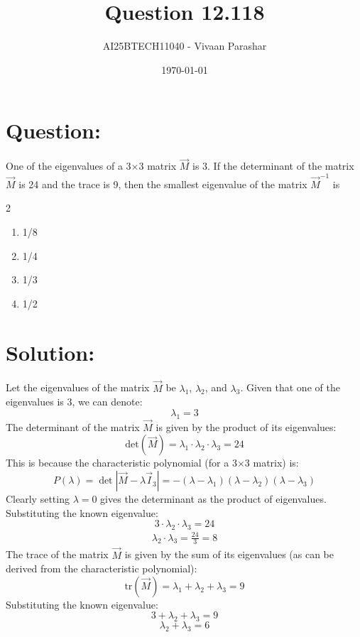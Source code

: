 \documentclass[a4paper, 12pt]{article}
\title{Question 12.118}
\author{AI25BTECH11040 - Vivaan Parashar}
\date{\today}
\begin{document}
\maketitle

\section{Question: }
One of the eigenvalues of a 3$\times$3 matrix $\vec{M}$ is 3. If the determinant of the matrix $\vec{M}$ is 24 and the trace is 9, then the smallest eigenvalue of the matrix $\vec{M}^{-1}$ is
\begin{multicols}{2}
    \begin{enumerate}[label=\alph*)]
        \item 1/8
        \item 1/4
        \item 1/3
        \item 1/2
    \end{enumerate}
\end{multicols}

\section{Solution: }
Let the eigenvalues of the matrix $\vec{M}$ be $\lambda_1$, $\lambda_2$, and $\lambda_3$. Given that one of the eigenvalues is 3, we can denote:
\[\lambda_1 = 3\]
The determinant of the matrix $\vec{M}$ is given by the product of its eigenvalues:
\[\text{det}(\vec{M}) = \lambda_1 \cdot \lambda_2 \cdot \lambda_3 = 24\]
This is because the characteristic polynomial (for a 3$\times$3 matrix) is:
\[P(\lambda) = \det\left|\vec{M}-\lambda \vec{I}_3\right| = -(\lambda - \lambda_1)(\lambda - \lambda_2)(\lambda - \lambda_3)\]
Clearly setting $\lambda = 0$ gives the determinant as the product of eigenvalues.
Substituting the known eigenvalue:
\[3 \cdot \lambda_2 \cdot \lambda_3 = 24\]
\begin{align}
    \lambda_2 \cdot \lambda_3 = \frac{24}{3} = 8
\end{align}
The trace of the matrix $\vec{M}$ is given by the sum of its eigenvalues (as can be derived from the characteristic polynomial):
\[\text{tr}(\vec{M}) = \lambda_1 + \lambda_2 + \lambda_3 = 9\]
Substituting the known eigenvalue:
\[3 + \lambda_2 + \lambda_3 = 9\]
\[\lambda_2 + \lambda_3 = 6\]
\end{document}
